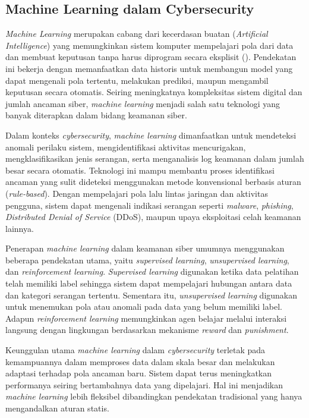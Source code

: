 \subsection{Machine Learning dalam Cybersecurity}

\textit{Machine Learning} merupakan cabang dari kecerdasan buatan (\textit{Artificial Intelligence}) yang memungkinkan sistem komputer mempelajari pola dari data dan membuat keputusan tanpa harus diprogram secara eksplisit (\cite{mitchell1997}). Pendekatan ini bekerja dengan memanfaatkan data historis untuk membangun model yang dapat mengenali pola tertentu, melakukan prediksi, maupun mengambil keputusan secara otomatis. Seiring meningkatnya kompleksitas sistem digital dan jumlah ancaman siber, \textit{machine learning} menjadi salah satu teknologi yang banyak diterapkan dalam bidang keamanan siber.

Dalam konteks \textit{cybersecurity}, \textit{machine learning} dimanfaatkan untuk mendeteksi anomali perilaku sistem, mengidentifikasi aktivitas mencurigakan, mengklasifikasikan jenis serangan, serta menganalisis log keamanan dalam jumlah besar secara otomatis. Teknologi ini mampu membantu proses identifikasi ancaman yang sulit dideteksi menggunakan metode konvensional berbasis aturan (\textit{rule-based}). Dengan mempelajari pola lalu lintas jaringan dan aktivitas pengguna, sistem dapat mengenali indikasi serangan seperti \textit{malware}, \textit{phishing}, \textit{Distributed Denial of Service} (DDoS), maupun upaya eksploitasi celah keamanan lainnya.

Penerapan \textit{machine learning} dalam keamanan siber umumnya menggunakan beberapa pendekatan utama, yaitu \textit{supervised learning}, \textit{unsupervised learning}, dan \textit{reinforcement learning}. \textit{Supervised learning} digunakan ketika data pelatihan telah memiliki label sehingga sistem dapat mempelajari hubungan antara data dan kategori serangan tertentu. Sementara itu, \textit{unsupervised learning} digunakan untuk menemukan pola atau anomali pada data yang belum memiliki label. Adapun \textit{reinforcement learning} memungkinkan agen belajar melalui interaksi langsung dengan lingkungan berdasarkan mekanisme \textit{reward} dan \textit{punishment}.

Keunggulan utama \textit{machine learning} dalam \textit{cybersecurity} terletak pada kemampuannya dalam memproses data dalam skala besar dan melakukan adaptasi terhadap pola ancaman baru. Sistem dapat terus meningkatkan performanya seiring bertambahnya data yang dipelajari. Hal ini menjadikan \textit{machine learning} lebih fleksibel dibandingkan pendekatan tradisional yang hanya mengandalkan aturan statis.

